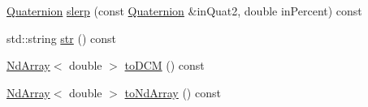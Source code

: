 \begin{DoxyCompactItemize}
\mbox{\hyperlink{class_num_c_1_1_rotations_1_1_quaternion}{Quaternion}} \mbox{\hyperlink{class_num_c_1_1_rotations_1_1_quaternion_a8df593fa367af70a45c15d512265e7cc}{slerp}} (const \mbox{\hyperlink{class_num_c_1_1_rotations_1_1_quaternion}{Quaternion}} \&in\+Quat2, double in\+Percent) const
\item 
std\+::string \mbox{\hyperlink{class_num_c_1_1_rotations_1_1_quaternion_acfbebb57979affccc41ce9149c612880}{str}} () const
\item 
\mbox{\hyperlink{class_num_c_1_1_nd_array}{Nd\+Array}}$<$ double $>$ \mbox{\hyperlink{class_num_c_1_1_rotations_1_1_quaternion_a1c1434c74c57d4dbf9d4cfcc1a1cb9cf}{to\+D\+CM}} () const
\item 
\mbox{\hyperlink{class_num_c_1_1_nd_array}{Nd\+Array}}$<$ double $>$ \mbox{\hyperlink{class_num_c_1_1_rotations_1_1_quaternion_a3a1199a8d661891685ab281166217210}{to\+Nd\+Array}} () const
\end{DoxyCompactItemize}
